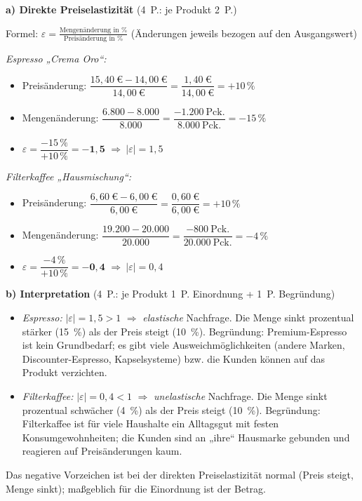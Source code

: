 \begin{loesung}[title={Lösung Aufgabe~1.3 --- Preiselastizität und Umsatzwirkung}]
\textbf{a) Direkte Preiselastizität} \hfill (4~P.: je Produkt 2~P.)

Formel: $\displaystyle \varepsilon = \frac{\text{Mengenänderung in \%}}{\text{Preisänderung in \%}}$
\quad (Änderungen jeweils bezogen auf den Ausgangswert)

\smallskip
\emph{Espresso „Crema Oro``:}
\begin{itemize}
  \item Preisänderung: $\dfrac{15{,}40~\text{€} - 14{,}00~\text{€}}{14{,}00~\text{€}}
    = \dfrac{1{,}40~\text{€}}{14{,}00~\text{€}} = +10\,\%$
  \item Mengenänderung: $\dfrac{6.800 - 8.000}{8.000} = \dfrac{-1.200~\text{Pck.}}{8.000~\text{Pck.}} = -15\,\%$
  \item $\varepsilon = \dfrac{-15\,\%}{+10\,\%} = \mathbf{-1{,}5}$ \quad $\Rightarrow\ |\varepsilon| = 1{,}5$
\end{itemize}

\emph{Filterkaffee „Hausmischung``:}
\begin{itemize}
  \item Preisänderung: $\dfrac{6{,}60~\text{€} - 6{,}00~\text{€}}{6{,}00~\text{€}}
    = \dfrac{0{,}60~\text{€}}{6{,}00~\text{€}} = +10\,\%$
  \item Mengenänderung: $\dfrac{19.200 - 20.000}{20.000} = \dfrac{-800~\text{Pck.}}{20.000~\text{Pck.}} = -4\,\%$
  \item $\varepsilon = \dfrac{-4\,\%}{+10\,\%} = \mathbf{-0{,}4}$ \quad $\Rightarrow\ |\varepsilon| = 0{,}4$
\end{itemize}

\textbf{b) Interpretation} \hfill (4~P.: je Produkt 1~P. Einordnung + 1~P. Begründung)
\begin{itemize}
  \item \emph{Espresso:} $|\varepsilon| = 1{,}5 > 1$ $\Rightarrow$ \emph{elastische}
    Nachfrage. Die Menge sinkt prozentual stärker (15~\%) als der Preis steigt (10~\%).
    Begründung: Premium-Espresso ist kein Grundbedarf; es gibt viele Ausweichmöglichkeiten
    (andere Marken, Discounter-Espresso, Kapselsysteme) bzw. die Kunden können auf das
    Produkt verzichten.
  \item \emph{Filterkaffee:} $|\varepsilon| = 0{,}4 < 1$ $\Rightarrow$ \emph{unelastische}
    Nachfrage. Die Menge sinkt prozentual schwächer (4~\%) als der Preis steigt (10~\%).
    Begründung: Filterkaffee ist für viele Haushalte ein Alltagsgut mit festen
    Konsumgewohnheiten; die Kunden sind an „ihre`` Hausmarke gebunden und reagieren auf
    Preisänderungen kaum.
\end{itemize}
Das negative Vorzeichen ist bei der direkten Preiselastizität normal (Preis steigt,
Menge sinkt); maßgeblich für die Einordnung ist der Betrag.


\end{loesung}
